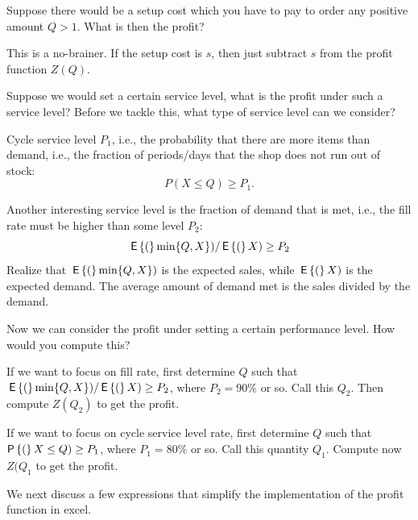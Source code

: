 \begin{question}
  Suppose there would be a setup cost which you have to pay to order any positive amount $Q>1$. What is then the profit? 
  \begin{solution}
    This is a no-brainer. If the setup cost is $s$, then just subtract
    $s$ from the profit function $Z(Q)$.
  \end{solution}
\end{question}

\begin{question}
Suppose we would set a certain service level, what is the profit under such a service level? Before we tackle this, what type of service level can we consider? 
\begin{solution}
  Cycle service level $P_1$, i.e., the probability that there are more
  items than demand, i.e., the fraction of periods/days that the shop
  does not run out of stock:
\begin{equation*}
P(X\leq Q) \geq P_1.
\end{equation*}

Another interesting service level is the fraction of demand that is met, i.e., the fill rate must be higher than some level $P_2$:
\begin{equation*}
\,\mathsf{E}\left\{(\right\}\min\{Q, X\})/ \,\mathsf{E}\left\{(\right\}X) \geq P_2
\end{equation*}
Realize that $\,\mathsf{E}\left\{(\right\}\min\{Q, X\})$ is the expected sales, while $\,\mathsf{E}\left\{(\right\}X)$ is the expected demand. The average amount of demand met is the sales divided by the demand.
\end{solution}
\end{question}

\begin{question}
  Now we can consider the profit under setting a certain performance level. How would you compute this?
  \begin{solution}
    If we want to focus on fill rate, first determine $Q$ such that
    $\,\mathsf{E}\left\{(\right\}\min\{Q, X\})/ \,\mathsf{E}\left\{(\right\}X) \geq P_2$, where $P_2=90\%$ or so. Call
    this $Q_2$. Then compute $Z(Q_2)$ to get the profit. 

    If we want to focus on cycle service level rate, first determine
    $Q$ such that $\P(X\leq Q) \geq P_1$, where $P_1=80\%$ or so. Call
    this quantity $Q_1$. Compute now $Z(Q_1$ to get the profit.
  \end{solution}
\end{question}

We next  discuss a few expressions that simplify the implementation of the profit function in excel.

